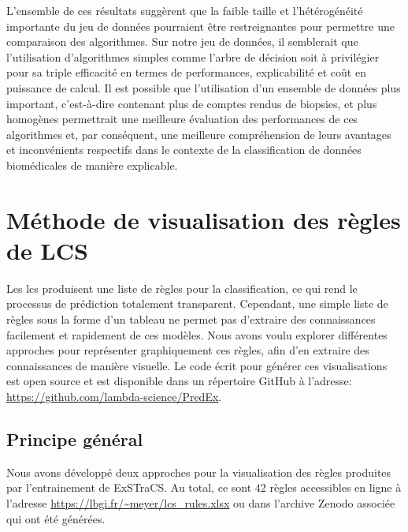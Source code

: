 L'ensemble de ces résultats suggèrent que la faible taille et l'hétérogénéité importante du jeu de données pourraient être restreignantes pour permettre une comparaison des algorithmes. Sur notre jeu de données, il semblerait que l'utilisation d'algorithmes simples comme l'arbre de décision soit à privilégier pour sa triple efficacité en termes de performances, explicabilité et coût en puissance de calcul.  Il est possible que l'utilisation d'un ensemble de données plus important, c’est-à-dire contenant plus de comptes rendus de biopsies, et plus homogènes permettrait une meilleure évaluation des performances de ces algorithmes et, par conséquent, une meilleure compréhension de leurs avantages et inconvénients respectifs dans le contexte de la classification de données biomédicales de manière explicable.

\section{Méthode de visualisation des règles de LCS}
Les \gls{lcs} produisent une liste de règles pour la classification, ce qui rend le processus de prédiction totalement transparent. Cependant, une simple liste de règles sous la forme d'un tableau ne permet pas d'extraire des connaissances facilement et rapidement de ces modèles. Nous avons voulu explorer différentes approches pour représenter graphiquement ces règles, afin d'en extraire des connaissances de manière visuelle. Le code écrit pour générer ces visualisations est open source et est disponible dans un répertoire GitHub à l'adresse: \url{https://github.com/lambda-science/PredEx}.
\subsection{Principe général}
Nous avons développé deux approches pour la visualisation des règles produites par l'entrainement de  ExSTraCS. Au total, ce sont 42 règles accessibles en ligne à l'adresse \url{https://lbgi.fr/~meyer/lcs_rules.xlsx} ou dans l'archive Zenodo associée qui ont été générées.

